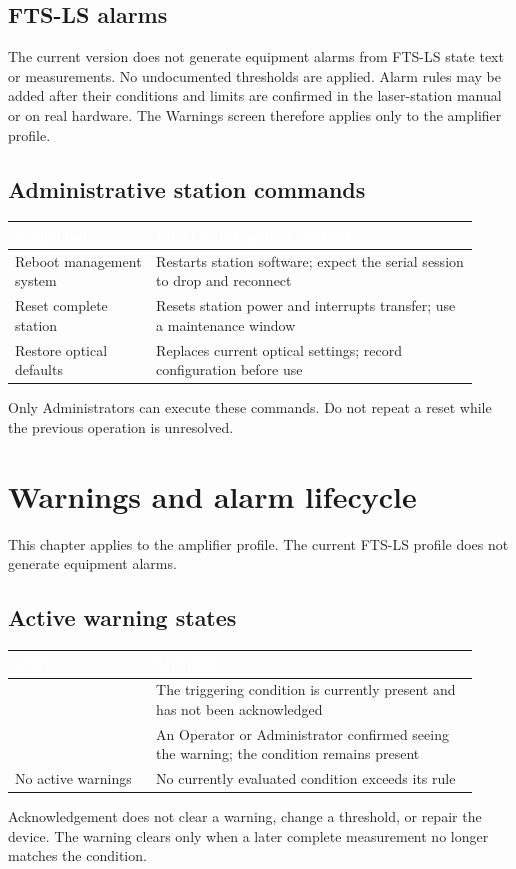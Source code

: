 \documentclass[11pt,a4paper,oneside]{book}
\newcommand{\thead}[1]{\cellcolor{panelblue}\textcolor{white}{\textbf{#1}}}
\DeclareRobustCommand{\code}[1]{\texttt{\detokenize{#1}}}
\begin{document}
\section{FTS-LS alarms}
The current version does not generate equipment alarms from FTS-LS state text or measurements. No undocumented thresholds are applied. Alarm rules may be added after their conditions and limits are confirmed in the laser-station manual or on real hardware. The Warnings screen therefore applies only to the amplifier profile.

\section{Administrative station commands}
\begin{longtable}{|>{\centering\arraybackslash}m{0.28\linewidth}|>{\centering\arraybackslash}m{0.64\linewidth}|}
\hline
\thead{Command} & \thead{Effect and required caution} \\
\hline
\endhead
Reboot management system & Restarts station software; expect the serial session to drop and reconnect \\
\hline
Reset complete station & Resets station power and interrupts transfer; use a maintenance window \\
\hline
Restore optical defaults & Replaces current optical settings; record configuration before use \\
\hline
\end{longtable}
Only Administrators can execute these commands. Do not repeat a reset while the previous operation is unresolved.

\chapter{Warnings and alarm lifecycle}
This chapter applies to the amplifier profile. The current FTS-LS profile does not generate equipment alarms.

\section{Active warning states}
\begin{longtable}{|>{\centering\arraybackslash}m{0.28\linewidth}|>{\centering\arraybackslash}m{0.64\linewidth}|}
\hline
\thead{State} & \thead{Meaning} \\
\hline
\endhead
\code{Open} & The triggering condition is currently present and has not been acknowledged \\
\hline
\code{Acknowledged} & An Operator or Administrator confirmed seeing the warning; the condition remains present \\
\hline
No active warnings & No currently evaluated condition exceeds its rule \\
\hline
\end{longtable}
Acknowledgement does not clear a warning, change a threshold, or repair the device. The warning clears only when a later complete measurement no longer matches the condition.
\end{document}
